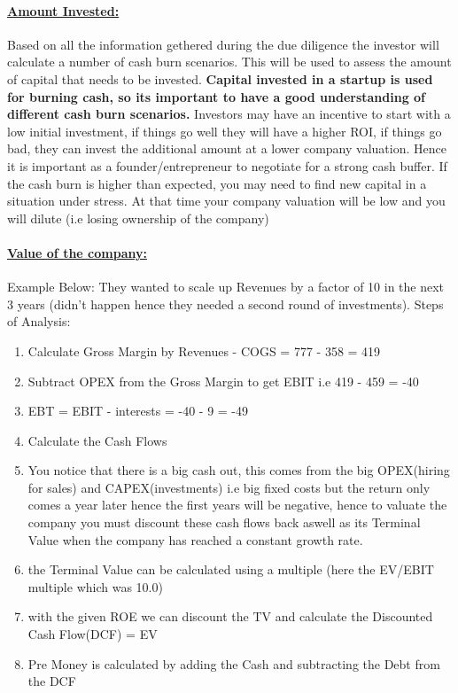 \documentclass[8pt]{extreport}
\begin{document}
{\paragraph{\underline{Amount Invested:}} \small{Based on all the information gethered during the due diligence the investor will calculate a number of cash burn scenarios. This will be used to assess the amount of capital that needs to be invested.
\textbf{Capital invested in a startup is used for burning cash, so its important to have a good understanding of different cash burn scenarios.} Investors may have an incentive to start with a low initial investment, if things go well they will have a higher ROI, if things go bad, they can invest the additional amount at a lower company valuation. Hence it is important as a founder/entrepreneur to negotiate for a strong cash buffer. If the cash burn is higher than expected, you may need to find new capital in a situation under stress. At that time your company valuation will be low and you will dilute (i.e losing ownership of the company)}
\newpage
\paragraph{\underline{Value of the company:}} Example Below: They wanted to scale up Revenues by a factor of 10 in the next 3 years (didn't happen hence they needed a second round of investments). Steps of Analysis:
\begin{enumerate}[label=(\roman*)]
\item Calculate Gross Margin by Revenues - COGS = 777 - 358 = 419 
\item Subtract OPEX from the Gross Margin to get EBIT i.e 419 - 459 = -40
\item EBT = EBIT - interests = -40 - 9 = -49
\item Calculate the Cash Flows
\item You notice that there is a big cash out, this comes from the big OPEX(hiring for sales) and CAPEX(investments) i.e big fixed costs but the return only comes a year later hence the first years will be negative, hence to valuate the company you must discount these cash flows back aswell as its Terminal Value when the company has reached a constant growth rate.
\item the Terminal Value can be calculated using a multiple (here the EV/EBIT multiple which was 10.0)
\item with the given ROE we can discount the TV and calculate the Discounted Cash Flow(DCF) = EV
\item Pre Money is calculated by adding the Cash and subtracting the Debt from the DCF
\end{enumerate}

}
\end{document}
